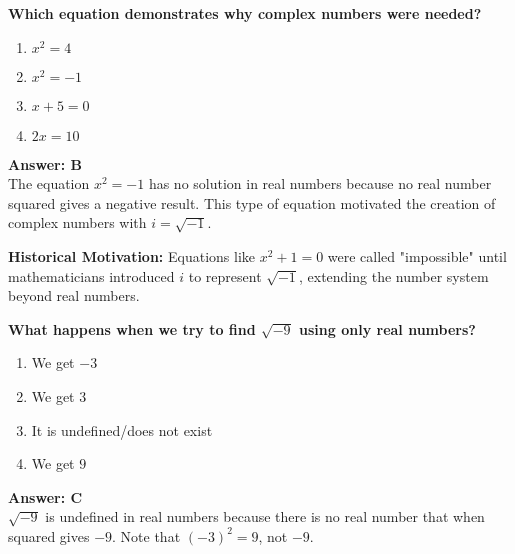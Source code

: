 \documentclass[12pt,a4paper]{article}
\begin{document}
\begin{questiontitle}[MCQ 4]
\textbf{Which equation demonstrates why complex numbers were needed?}
\end{questiontitle}

\begin{partbox}[Options]
\begin{enumerate}[label=\Alph*.]
    \item \( x^2 = 4 \)
    \item \( x^2 = -1 \)
    \item \( x + 5 = 0 \)
    \item \( 2x = 10 \)
\end{enumerate}
\end{partbox}

\begin{answerstyle}
\textbf{Answer: B} \\
The equation \( x^2 = -1 \) has no solution in real numbers because no real number squared gives a negative result. This type of equation motivated the creation of complex numbers with \( i = \sqrt{-1} \).
\end{answerstyle}

\begin{conceptbox}
\textbf{Historical Motivation:} Equations like \( x^2 + 1 = 0 \) were called "impossible" until mathematicians introduced \( i \) to represent \( \sqrt{-1} \), extending the number system beyond real numbers.
\end{conceptbox}

\newpage

\begin{questiontitle}[MCQ 5]
\textbf{What happens when we try to find \( \sqrt{-9} \) using only real numbers?}
\end{questiontitle}

\begin{partbox}[Options]
\begin{enumerate}[label=\Alph*.]
    \item We get \( -3 \)
    \item We get \( 3 \)
    \item It is undefined/does not exist
    \item We get \( 9 \)
\end{enumerate}
\end{partbox}

\begin{answerstyle}
\textbf{Answer: C} \\
\( \sqrt{-9} \) is undefined in real numbers because there is no real number that when squared gives \( -9 \). Note that \( (-3)^2 = 9 \), not \( -9 \).
\end{answerstyle}
\end{document}
